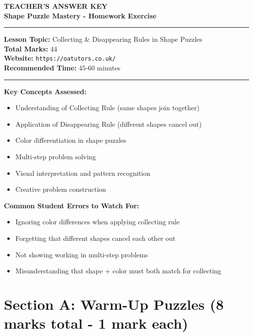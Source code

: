 \documentclass{article}
\begin{document}
\onehalfspacing

\begin{center}
\textbf{\Large TEACHER'S ANSWER KEY}\\
\textbf{\Large Shape Puzzle Mastery - Homework Exercise}
\vspace{0.2cm}
\end{center}

\hrule
\vspace{0.1cm}

\textbf{Lesson Topic:} Collecting \& Disappearing Rules in Shape Puzzles \\
\textbf{Total Marks:} 44 \\
\textbf{Website:} \texttt{https://oatutors.co.uk/} \\
\textbf{Recommended Time:} 45-60 minutes

\vspace{0.2cm}
\hrule
\vspace{0.3cm}

\begin{tcolorbox}[colback=yellow!10,colframe=orange!60,title=Teaching Notes]
\textbf{Key Concepts Assessed:}
\begin{itemize}
    \item Understanding of Collecting Rule (same shapes join together)
    \item Application of Disappearing Rule (different shapes cancel out)
    \item Color differentiation in shape puzzles
    \item Multi-step problem solving
    \item Visual interpretation and pattern recognition
    \item Creative problem construction
\end{itemize}

\textbf{Common Student Errors to Watch For:}
\begin{itemize}
    \item Ignoring color differences when applying collecting rule
    \item Forgetting that different shapes cancel each other out
    \item Not showing working in multi-step problems
    \item Misunderstanding that shape + color must both match for collecting
\end{itemize}
\end{tcolorbox}

\section{Section A: Warm-Up Puzzles (8 marks total - 1 mark each)}
\end{document}
